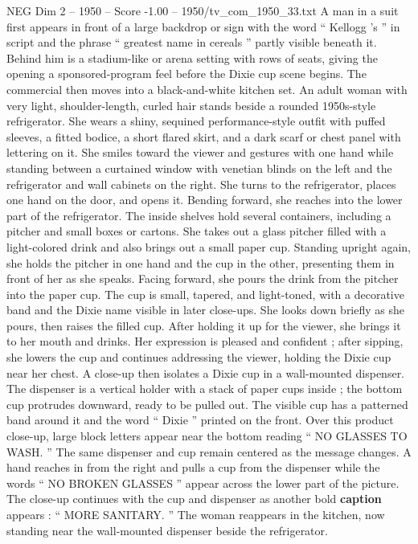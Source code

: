 \begin{textsample}{NEG Dim 2 – 1950 – Score -1.00 – 1950/tv\_com\_1950\_33.txt}  \label{ex:f2_neg_003}
A man in a suit first appears in front of a large backdrop or sign with the word “ Kellogg ’s ” in script and the phrase “ greatest name in cereals ” partly visible beneath it.
Behind him is a stadium-like or arena setting with rows of seats, giving the opening a sponsored-program feel before the Dixie cup scene begins.
The commercial then moves into a black-and-white kitchen set.
An adult woman with very light, shoulder-length, curled hair stands beside a rounded 1950s-style refrigerator.
She wears a shiny, sequined performance-style outfit with puffed sleeves, a fitted bodice, a short flared skirt, and a dark scarf or chest panel with lettering on it.
She smiles toward the viewer and gestures with one hand while standing between a curtained window with venetian blinds on the left and the refrigerator and wall cabinets on the right.
She turns to the refrigerator, places one hand on the door, and opens it.
Bending forward, she reaches into the lower part of the refrigerator.
The inside shelves hold several containers, including a pitcher and small boxes or cartons.
She takes out a glass pitcher filled with a light-colored drink and also brings out a small paper cup.
Standing upright again, she holds the pitcher in one hand and the cup in the other, presenting them in front of her as she speaks.
Facing forward, she pours the drink from the pitcher into the paper cup.
The cup is small, tapered, and light-toned, with a decorative band and the Dixie name visible in later close-ups.
She looks down briefly as she pours, then raises the filled cup.
After holding it up for the viewer, she brings it to her mouth and drinks.
Her expression is pleased and confident ; after sipping, she lowers the cup and continues addressing the viewer, holding the Dixie cup near her chest.
A close-up then isolates a Dixie cup in a wall-mounted dispenser.
The dispenser is a vertical holder with a stack of paper cups inside ; the bottom cup protrudes downward, ready to be pulled out.
The visible cup has a patterned band around it and the word “ Dixie ” printed on the front.
Over this product close-up, large block letters appear near the bottom reading “ NO GLASSES TO WASH. ” The same dispenser and cup remain centered as the message changes.
A hand reaches in from the right and pulls a cup from the dispenser while the words “ NO BROKEN GLASSES ” appear across the lower part of the picture.
The close-up continues with the cup and dispenser as another bold \textbf{caption} appears : “ MORE SANITARY. ” The woman reappears in the kitchen, now standing near the wall-mounted dispenser beside the refrigerator.

\end{textsample}

